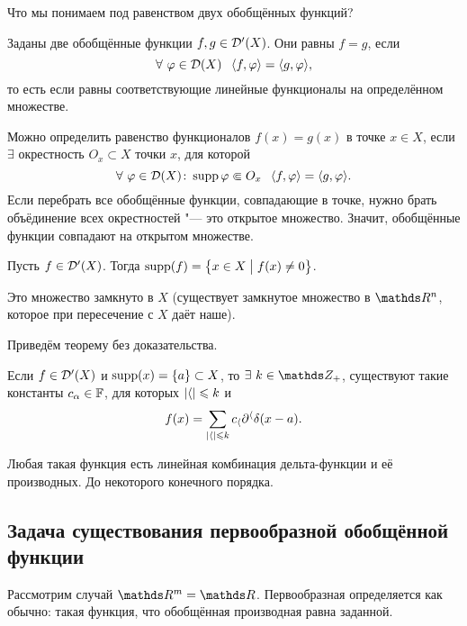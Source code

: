 Что мы понимаем под равенством двух обобщённых функций?
\begin{Def}
Заданы две обобщённые функции $f,g\in\mathcal D'(X)$. Они равны $f=g$, если
\[
  \forall\ \phi\in\D(X)\pau \la f,\phi\ra = \la g,\phi\ra,
\]
то есть если равны соответствующие линейные функционалы на определённом множестве.

Можно определить равенство функционалов $f(x)=g(x)$ в точке $x\in X$, если $\exists$ окрестность $O_x\subset X$ точки $x$, для которой
\[
  \forall\ \varphi\in \mathcal D(X)\colon \operatorname{supp} \varphi\Subset O_x\hskip .75em plus.1em minus.08em\relax \langle f,\varphi\rangle = \langle g,\varphi\rangle.
\]
Если перебрать все обобщённые функции, совпадающие в точке, нужно брать объёдинение всех окрестностей "--- это открытое множество. Значит, обобщённые функции совпадают на открытом множестве.
\end{Def}

\begin{Def}
 Пусть $f\in\mathcal D'(X)$. Тогда $\operatorname{supp}(f) = \big\{x\in X\bigm|f(x)\ne0\big\}$.
\end{Def}
Это множество замкнуто в $X$ (существует замкнутое множество в $\R^n$, которое при пересечение с $X$ даёт наше).

Приведём теорему без доказательства.
\begin{The}
  Если $f\in\mathcal D'(X)$ и $\operatorname{supp}(x) = \{a\}\subset X$, то $\exists\ k\in\Z_+$, существуют такие константы $c_\alpha\in\mathbb F$, для которых $|\langle|\leqslant k$ и
\[
  f(x) = \sum\limits_{|\langle|\leqslant k}c_\langle\partial^\langle\delta(x-a).
\]
\end{The}
Любая такая функция есть линейная комбинация дельта-функции и её производных. До некоторого конечного порядка.


\subsection{Задача существования первообразной обобщённой функции}
Рассмотрим случай $\R^m=\R$. Первообразная определяется как обычно: такая функция, что обобщённая производная равна заданной.

